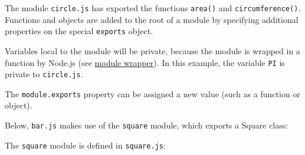 The module \texttt{circle.js} has exported the functions \texttt{area()}
and \texttt{circumference()}. Functions and objects are added to the
root of a module by specifying additional properties on the special
\texttt{exports} object.

Variables local to the module will be private, because the module is
wrapped in a function by Node.js (see
\hyperref[the-module-wrapper]{module wrapper}). In this example, the
variable \texttt{PI} is private to \texttt{circle.js}.

The \texttt{module.exports} property can be assigned a new value (such
as a function or object).

Below, \texttt{bar.js} makes use of the \texttt{square} module, which
exports a Square class:

\begin{Shaded}
\begin{Highlighting}[]
\OperatorTok{=} \NormalTok{(}\NormalTok{)}\OperatorTok{;}
\OperatorTok{=}  \NormalTok{(}\NormalTok{)}\OperatorTok{;}
\NormalTok{(}\SpecialCharTok{$\{}\NormalTok{()}\SpecialCharTok{\}}\VerbatimStringTok{\textasciigrave{}}\NormalTok{)}\OperatorTok{;}
\end{Highlighting}
\end{Shaded}

The \texttt{square} module is defined in \texttt{square.js}:

\begin{Shaded}
\begin{Highlighting}[]
 \OperatorTok{=} 
     \OperatorTok{=}\OperatorTok{;}
\NormalTok{  \}}

  \NormalTok{() \{}
      \OperatorTok{**} \OperatorTok{;}
\NormalTok{  \}}
\NormalTok{\}}\OperatorTok{;}
\end{Highlighting}
\end{Shaded}

